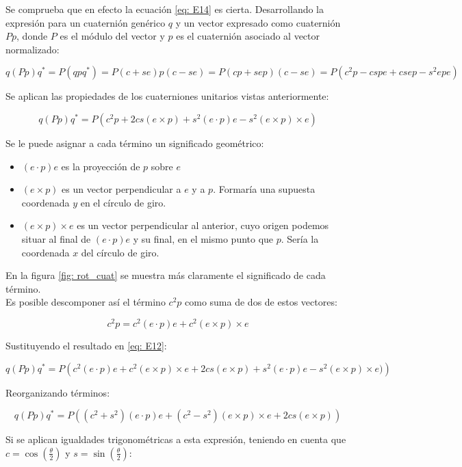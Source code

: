 \documentclass[12pt, a4paper]{report}
\begin{document}
Se comprueba que en efecto la ecuación \eqref{eq: E14} es cierta. Desarrollando la expresión para un cuaternión genérico $q$ y un vector expresado como cuaternión $Pp$, donde $P$ es el módulo del vector y $p$ es el cuaternión asociado al vector normalizado:

$$ q(Pp)q^* = P(qpq^*) = P(c+se)p(c-se) = P(cp + sep)(c - se) = P(c^2p - cspe + csep - s^2epe) $$

Se aplican las propiedades de los cuaterniones unitarios vistas anteriormente:

\begin{equation} \label{eq: E12} 
q(Pp)q^* = P(c^2p + 2cs(e \times p) + s^2(e \cdot p)e - s^2(e \times p) \times e) 
\end{equation}

Se le puede asignar a cada término un significado geométrico:

\begin{itemize}

\item $(e \cdot p)e$ es la proyección de $p$ sobre $e$
\item $(e \times p)$ es un vector perpendicular a $e$ y a $p$. Formaría una supuesta coordenada $y$ en el círculo de giro.
\item $(e \times p) \times e$ es un vector perpendicular al anterior, cuyo origen podemos situar al final de $(e \cdot p)e$ y su final, en el mismo punto que $p$. Sería la coordenada $x$ del círculo de giro.

\end{itemize}  

En la figura \ref{fig: rot_cuat} se muestra más claramente el significado de cada término.\\

Es posible descomponer así el término $c^2p$ como suma de dos de estos vectores:

$$ c^2p = c^2(e \cdot p)e + c^2(e \times p) \times e $$

Sustituyendo el resultado en \eqref{eq: E12}:

$$ q(Pp)q^* = P\left(c^2(e \cdot p)e + c^2(e \times p) \times e + 2cs(e \times p) + s^2(e \cdot p)e - s^2(e \times p) \times e)\right) $$

Reorganizando términos:

$$ q(Pp)q^* = P\left((c^2 + s^2)(e \cdot p)e + (c^2 - s^2)(e \times p) \times e + 2cs(e \times p)\right) $$

Si se aplican igualdades trigonométricas a esta expresión, teniendo en cuenta que $c = \cos\left(\frac{\theta}{2}\right)$ y $s = \sin\left(\frac{\theta}{2}\right)$:
\end{document}
